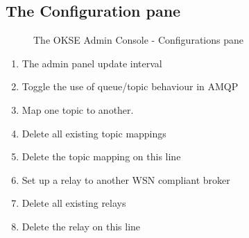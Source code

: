 \clearpage

\subsection{The Configuration pane}
\begin{center}
  \begin{figure}[ht!]
    \caption{The OKSE Admin Console - Configurations pane} 
    \label{fig:OKSE Admin Console - Configurations pane}
  \end{figure}
\end{center}
\begin{enumerate}
\item The admin panel update interval
\item Toggle the use of queue/topic behaviour in AMQP
\item Map one topic to another.
\item Delete all existing topic mappings
\item Delete the topic mapping on this line
\item Set up a relay to another WSN compliant broker
\item Delete all existing relays
\item Delete the relay on this line
\end{enumerate}

\clearpage

